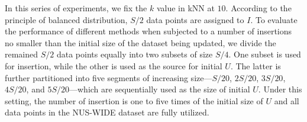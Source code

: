  In this series of experiments, we fix the $k$ value in kNN at $10$. According to the principle of balanced distribution, $S/2$ data points are assigned to $I$. To evaluate the performance of different methods when subjected to a number of insertions no smaller than the initial size of the dataset being updated, we divide the remained $S/2$ data points equally into two subsets of size $S/4$. One subset is used for insertion, while the other is used as the source for initial $U$. The latter is further partitioned into five segments of increasing size—$S/20$, $2S/20$, $3S/20$, $4S/20$, and $5S/20$—which are sequentially used as the size of initial $U$. Under this setting, the number of insertion is one to five times of the initial size of $U$ and all data points in the NUS-WIDE dataset are fully utilized.

